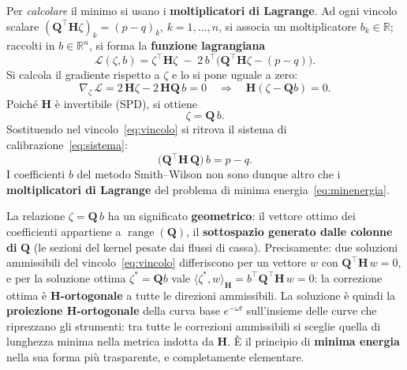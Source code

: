 \documentclass[11pt,a4paper]{article}
\theoremstyle{plain}
\theoremstyle{definition}
\theoremstyle{remark}
\newcommand{\Qmat}{\mathbf{Q}}
\newcommand{\Hmat}{\mathbf{H}}
\newcommand{\transp}{^{\!\top}}
\begin{document}
Per \emph{calcolare} il minimo si usano i \textbf{moltiplicatori di Lagrange}.
Ad ogni vincolo scalare $(\Qmat\transp\Hmat\zeta)_k = (p-q)_k$, $k=1,\ldots,n$,
si associa un moltiplicatore $b_k\in\mathbb{R}$; raccolti in $b\in\mathbb{R}^n$, si forma la
\textbf{funzione lagrangiana}
\begin{equation}
  \mathcal{L}(\zeta,b)
  = \zeta\transp\Hmat\zeta
    \;-\; 2\,b\transp\!\bigl(\Qmat\transp\Hmat\zeta - (p-q)\bigr).
  \label{eq:lagrangiana}
\end{equation}
Si calcola il gradiente rispetto a $\zeta$ e lo si pone uguale a zero:
\[
  \nabla_\zeta\,\mathcal{L}
  = 2\,\Hmat\zeta - 2\,\Hmat\Qmat\,b = 0
  \quad\Longrightarrow\quad
  \Hmat(\zeta - \Qmat b) = 0.
\]
Poich\'e $\Hmat$ \`e invertibile (SPD), si ottiene
\[
  \zeta = \Qmat\, b .
\]
Sostituendo nel vincolo~\eqref{eq:vincolo} si ritrova il sistema di
calibrazione~\eqref{eq:sistema}:
\[
  \bigl(\Qmat\transp \Hmat\, \Qmat\bigr)\, b = p - q .
\]
I coefficienti $b$ del metodo Smith--Wilson non sono dunque altro che i
\textbf{moltiplicatori di Lagrange} del problema di minima energia~\eqref{eq:minenergia}.

La relazione $\zeta = \Qmat\,b$ ha un significato \textbf{geometrico}: il vettore ottimo dei
coefficienti appartiene a $\operatorname{range}(\Qmat)$, il \textbf{sottospazio generato
dalle colonne di} $\Qmat$ (le sezioni del kernel pesate dai flussi di cassa). Precisamente:
due soluzioni ammissibili del vincolo~\eqref{eq:vincolo} differiscono per un vettore $w$ con
$\Qmat\transp\Hmat\,w = 0$, e per la soluzione ottima $\zeta^\ast=\Qmat b$ vale
$\langle \zeta^\ast, w\rangle_{\Hmat} = b\transp\Qmat\transp\Hmat\,w = 0$: la correzione
ottima \`e \textbf{$\Hmat$-ortogonale} a tutte le direzioni ammissibili. La soluzione \`e
quindi la \textbf{proiezione $\Hmat$-ortogonale} della curva base $e^{-\omega t}$
sull'insieme delle curve che riprezzano gli strumenti: tra tutte le correzioni ammissibili
si sceglie quella di lunghezza minima nella metrica indotta da $\Hmat$. \`E il principio di
\textbf{minima energia} nella sua forma pi\`u trasparente, e completamente elementare.
\end{document}
